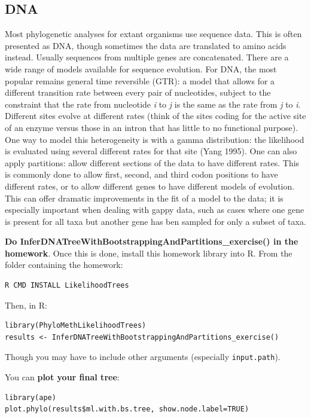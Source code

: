 \documentclass[]{article}
\begin{document}
\hypertarget{dna}{%
\subsection{DNA}\label{dna}}

Most phylogenetic analyses for extant organisms use sequence data. This is often presented as DNA, though sometimes the data are translated to amino acids instead. Usually sequences from multiple genes are concatenated. There are a wide range of models available for sequence evolution. For DNA, the most popular remains general time reversible (GTR): a model that allows for a different transition rate between every pair of nucleotides, subject to the constraint that the rate from nucleotide \emph{i} to \emph{j} is the same as the rate from \emph{j} to \emph{i}. Different sites evolve at different rates (think of the sites coding for the active site of an enzyme versus those in an intron that has little to no functional purpose). One way to model this heterogeneity is with a gamma distribution: the likelihood is evaluated using several different rates for that site (Yang 1995). One can also apply partitions: allow different sections of the data to have different rates. This is commonly done to allow first, second, and third codon positions to have different rates, or to allow different genes to have different models of evolution. This can offer dramatic improvements in the fit of a model to the data; it is especially important when dealing with gappy data, such as cases where one gene is present for all taxa but another gene has ben sampled for only a subset of taxa.

\textbf{Do InferDNATreeWithBootstrappingAndPartitions\_exercise() in the homework}. Once this is done, install this homework library into R. From the folder containing the homework:

\begin{verbatim}
R CMD INSTALL LikelihoodTrees
\end{verbatim}

Then, in R:

\begin{verbatim}
library(PhyloMethLikelihoodTrees)
results <- InferDNATreeWithBootstrappingAndPartitions_exercise()
\end{verbatim}

Though you may have to include other arguments (especially \texttt{input.path}).

You can \textbf{plot your final tree}:

\begin{verbatim}
library(ape)
plot.phylo(results$ml.with.bs.tree, show.node.label=TRUE)
\end{verbatim}
\end{document}

